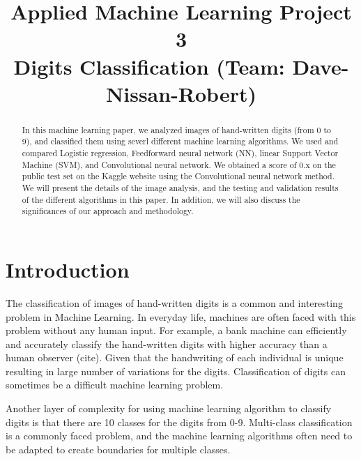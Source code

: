\documentclass[conference]{IEEEtran}
\begin{document}
\title{Applied Machine Learning Project 3 \\ Digits Classification (Team: Dave-Nissan-Robert)}

\author{
\and
{}
\and
{}
}

\maketitle

\begin{abstract}
In this machine learning paper, we analyzed images of hand-written digits (from 0 to 9), and classified them using severl different machine learning algorithms. We used and compared Logistic regression, Feedforward neural network (NN),  linear Support Vector Machine (SVM), and Convolutional neural network. We obtained a score of 0.x on the public test set on the Kaggle website using the Convolutional neural network method. We will present the details of the image analysis, and the testing and validation results of the different algorithms in this paper. In addition, we will also discuss the significances of our approach and methodology.
\end{abstract}

\IEEEpeerreviewmaketitle

\section{Introduction}
The classification of images of hand-written digits is a common and interesting problem in Machine Learning. In everyday life, machines are often faced with this problem without any human input. For example, a bank machine can efficiently and accurately classify the hand-written digits with higher accuracy than a human observer (cite). Given that the handwriting of each individual is unique resulting in large number of variations for the digits. Classification of digits can sometimes be a difficult machine learning problem.

Another layer of complexity for using machine learning algorithm to classify digits is that there are 10 classes for the digits from 0-9. Multi-class classification is a commonly faced problem, and the machine learning algorithms often need to be adapted to create boundaries for multiple classes.
\end{document}
